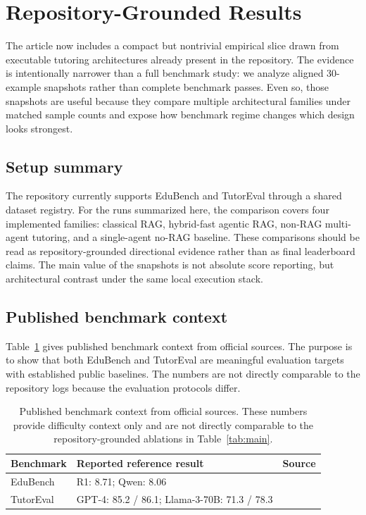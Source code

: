 \section{Repository-Grounded Results}

The article now includes a compact but nontrivial empirical slice drawn from executable tutoring architectures already present in the repository. The evidence is intentionally narrower than a full benchmark study: we analyze aligned 30-example snapshots rather than complete benchmark passes. Even so, those snapshots are useful because they compare multiple architectural families under matched sample counts and expose how benchmark regime changes which design looks strongest.

\subsection{Setup summary}

The repository currently supports EduBench and TutorEval through a shared dataset registry. For the runs summarized here, the comparison covers four implemented families: classical RAG, hybrid-fast agentic RAG, non-RAG multi-agent tutoring, and a single-agent no-RAG baseline. These comparisons should be read as repository-grounded directional evidence rather than as final leaderboard claims. The main value of the snapshots is not absolute score reporting, but architectural contrast under the same local execution stack.

\subsection{Published benchmark context}

Table~\ref{tab:public} gives published benchmark context from official sources. The purpose is to show that both EduBench and TutorEval are meaningful evaluation targets with established public baselines. The numbers are not directly comparable to the repository logs because the evaluation protocols differ.

\begin{table}[t]
\caption{Published benchmark context from official sources. These numbers provide difficulty context only and are not directly comparable to the repository-grounded ablations in Table~\ref{tab:main}.}
\label{tab:public}
\centering
\scriptsize
\begin{tabular}{p{1.25cm}p{3.15cm}p{1.85cm}}
\toprule
Benchmark & Reported reference result & Source \\
\midrule
EduBench & R1: 8.71; Qwen: 8.06 & \cite{xu2025edubench} \\
TutorEval & GPT-4: 85.2 / 86.1; Llama-3-70B: 71.3 / 78.3 & \cite{chevalier2024sciencetutors,lmsciencetutorrepo} \\
\bottomrule
\end{tabular}
\end{table}

